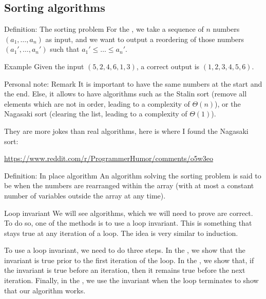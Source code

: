 \documentclass[a4paper]{article}
\begin{document}
\subsection{Sorting algorithms}
\begin{parag}{Definition: The sorting problem}
    For the , we take a sequence of $n$ numbers $\left(a_1, \ldots, a_n\right)$ as input, and we want to output a reordering of those numbers $\left(a_1', \ldots, a_n'\right)$ such that $a_1' \leq \ldots \leq a_n'$.

    \begin{subparag}{Example}
        Given the input $\left(5, 2, 4, 6, 1, 3\right)$, a correct output is $\left(1, 2, 3, 4, 5, 6\right)$.
    \end{subparag}
    

    \begin{subparag}{Personal note: Remark}
        It is important to have the same numbers at the start and the end. Else, it allows to have algorithms such as the Stalin sort (remove all elements which are not in order, leading to a complexity of $\Theta\left(n\right)$), or the Nagasaki sort (clearing the list, leading to a complexity of $\Theta\left(1\right)$).

        They are more jokes than real algorithms, here is where I found the Nagasaki sort:
        \begin{center}
            \small \url{https://www.reddit.com/r/ProgrammerHumor/comments/o5w3eo}
        \end{center}
        
    \end{subparag}
\end{parag}

\begin{parag}{Definition: In place algorithm}
    An algorithm solving the sorting problem is said to be  when the numbers are rearranged within the array (with at most a constant number of variables outside the array at any time).
\end{parag}


\begin{parag}{Loop invariant}
    We will see algorithms, which we will need to prove are correct. To do so, one of the methods is to use a loop invariant. This is something that stays true at any iteration of a loop. The idea is very similar to induction.

    To use a loop invariant, we need to do three steps. In the , we show that the invariant is true prior to the first iteration of the loop. In the , we show that, if the invariant is true before an iteration, then it remains true before the next iteration. Finally, in the , we use the invariant when the loop terminates to show that our algorithm works.
\end{parag}
\end{document}
